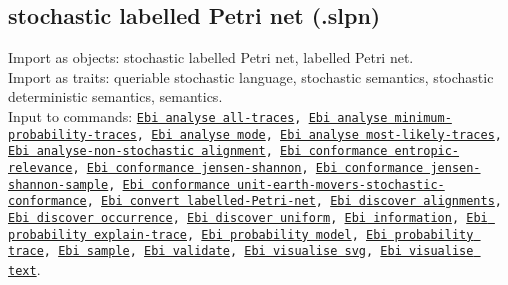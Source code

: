 {\subsection{stochastic labelled Petri net (.slpn)}
Import as objects: stochastic labelled Petri net, labelled Petri net.
\\Import as traits: queriable stochastic language, stochastic semantics, stochastic deterministic semantics, semantics.
\\Input to commands: \texttt{\hyperref[command:Ebi analyse all-traces]{Ebi analyse all-traces}, \hyperref[command:Ebi analyse minimum-probability-traces]{Ebi analyse minimum-probability-traces}, \hyperref[command:Ebi analyse mode]{Ebi analyse mode}, \hyperref[command:Ebi analyse most-likely-traces]{Ebi analyse most-likely-traces}, \hyperref[command:Ebi analyse-non-stochastic alignment]{Ebi analyse-non-stochastic alignment}, \hyperref[command:Ebi conformance entropic-relevance]{Ebi conformance entropic-relevance}, \hyperref[command:Ebi conformance jensen-shannon]{Ebi conformance jensen-shannon}, \hyperref[command:Ebi conformance jensen-shannon-sample]{Ebi conformance jensen-shannon-sample}, \hyperref[command:Ebi conformance unit-earth-movers-stochastic-conformance]{Ebi conformance unit-earth-movers-stochastic-conformance}, \hyperref[command:Ebi convert labelled-Petri-net]{Ebi convert labelled-Petri-net}, \hyperref[command:Ebi discover alignments]{Ebi discover alignments}, \hyperref[command:Ebi discover occurrence]{Ebi discover occurrence}, \hyperref[command:Ebi discover uniform]{Ebi discover uniform}, \hyperref[command:Ebi information]{Ebi information}, \hyperref[command:Ebi probability explain-trace]{Ebi probability explain-trace}, \hyperref[command:Ebi probability model]{Ebi probability model}, \hyperref[command:Ebi probability trace]{Ebi probability trace}, \hyperref[command:Ebi sample]{Ebi sample}, \hyperref[command:Ebi validate]{Ebi validate}, \hyperref[command:Ebi visualise svg]{Ebi visualise svg}, \hyperref[command:Ebi visualise text]{Ebi visualise text}}.
}
